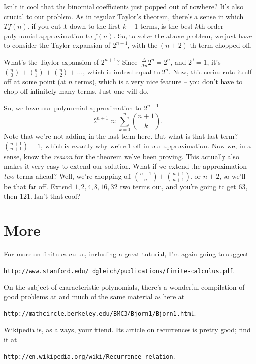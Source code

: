\documentclass[12pt,letterpaper]{article}
\begin{document}
Isn't it cool that the binomial coefficients just popped out of
nowhere? It's also crucial to our problem. As in regular Taylor's
theorem, there's a sense in which $T f(n)$, if you cut it down to the
first $k+1$ terms, is the best $k$th order polynomial approximation
to $f(n)$. So, to solve the above problem, we just have to consider
the Taylor expansion of $2^{n+1}$, with the $(n+2)$-th term chopped off.

What's the Taylor expansion of $2^{n+1}$? Since $\frac{\Delta}{\Delta
n} 2^n = 2^n$, and $2^0 = 1$, it's $\binom{n}{0} + \binom{n}{1} +
\binom{n}{2} + \ldots$, which is indeed equal to $2^n$. Now, this
series cuts itself off at some
point (at $n$ terms), which is a very nice feature -- you don't have
to chop off infinitely many terms. Just one will do.

So, we have our polynomial approximation to $2^{n+1}$:
$$2^{n+1} \approx \sum_{k=0}^{n} \binom{n+1}{k}.$$ Note that we're not adding in the
last term here. But what is that last term? $\binom{n+1}{n+1} = 1$,
which is exactly why we're 1 off in our approximation. Now we, in a
sense, know the \emph{reason} for the theorem we've been proving. This
actually also makes it very easy to extend our solution. What if we
extend the approximation \emph{two} terms ahead? Well, we're chopping
off $\binom{n+1}{n} + \binom{n+1}{n+1}$, or $n+2$, so we'll be that
far off. Extend $1, 2, 4, 8, 16, 32$ two terms out, and you're
going to get $63$, then $121$. Isn't that cool?

\section{More}
For more on finite calculus, including a great tutorial, I'm again going to suggest
\begin{center}\texttt{http://www.stanford.edu/\string~dgleich/publications/finite-calculus.pdf}.\end{center}

On the subject of characteristic polynomials, there's a wonderful
compilation of good problems at and much of the same material as here
at
\begin{center}\texttt{http://mathcircle.berkeley.edu/BMC3/Bjorn1/Bjorn1.html}.\end{center}

Wikipedia is, as always, your friend. Its article on recurrences
is pretty good; find it at
\begin{center}\texttt{http://en.wikipedia.org/wiki/Recurrence\string_relation}.\end{center}
\end{document}
